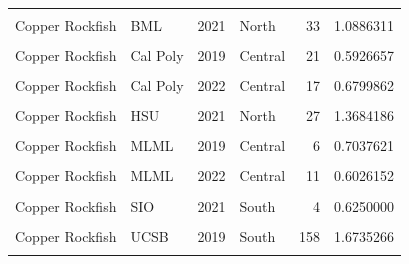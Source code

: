 \documentclass[
]{article}
\begin{document}
\begin{longtable}[t]{llrlrr}
\addlinespace
\cellcolor{gray!6}{Copper Rockfish} & \cellcolor{gray!6}{BML} & \cellcolor{gray!6}{2019} & \cellcolor{gray!6}{North} & \cellcolor{gray!6}{57} & \cellcolor{gray!6}{1.0481411}\\
Copper Rockfish & BML & 2021 & North & 33 & 1.0886311\\
\cellcolor{gray!6}{Copper Rockfish} & \cellcolor{gray!6}{BML} & \cellcolor{gray!6}{2022} & \cellcolor{gray!6}{North} & \cellcolor{gray!6}{22} & \cellcolor{gray!6}{0.7116277}\\
Copper Rockfish & Cal Poly & 2019 & Central & 21 & 0.5926657\\
\cellcolor{gray!6}{Copper Rockfish} & \cellcolor{gray!6}{Cal Poly} & \cellcolor{gray!6}{2021} & \cellcolor{gray!6}{Central} & \cellcolor{gray!6}{9} & \cellcolor{gray!6}{0.6336273}\\
\addlinespace
Copper Rockfish & Cal Poly & 2022 & Central & 17 & 0.6799862\\
\cellcolor{gray!6}{Copper Rockfish} & \cellcolor{gray!6}{HSU} & \cellcolor{gray!6}{2019} & \cellcolor{gray!6}{North} & \cellcolor{gray!6}{27} & \cellcolor{gray!6}{1.2968674}\\
Copper Rockfish & HSU & 2021 & North & 27 & 1.3684186\\
\cellcolor{gray!6}{Copper Rockfish} & \cellcolor{gray!6}{HSU} & \cellcolor{gray!6}{2022} & \cellcolor{gray!6}{North} & \cellcolor{gray!6}{26} & \cellcolor{gray!6}{1.6042550}\\
Copper Rockfish & MLML & 2019 & Central & 6 & 0.7037621\\
\addlinespace
\cellcolor{gray!6}{Copper Rockfish} & \cellcolor{gray!6}{MLML} & \cellcolor{gray!6}{2021} & \cellcolor{gray!6}{Central} & \cellcolor{gray!6}{12} & \cellcolor{gray!6}{0.5870757}\\
Copper Rockfish & MLML & 2022 & Central & 11 & 0.6026152\\
\cellcolor{gray!6}{Copper Rockfish} & \cellcolor{gray!6}{SIO} & \cellcolor{gray!6}{2019} & \cellcolor{gray!6}{South} & \cellcolor{gray!6}{1} & \cellcolor{gray!6}{0.3076923}\\
Copper Rockfish & SIO & 2021 & South & 4 & 0.6250000\\
\cellcolor{gray!6}{Copper Rockfish} & \cellcolor{gray!6}{SIO} & \cellcolor{gray!6}{2022} & \cellcolor{gray!6}{South} & \cellcolor{gray!6}{2} & \cellcolor{gray!6}{0.2857143}\\
\addlinespace
Copper Rockfish & UCSB & 2019 & South & 158 & 1.6735266\\
\cellcolor{gray!6}{Copper Rockfish} & \cellcolor{gray!6}{UCSB} & \cellcolor{gray!6}{2021} & \cellcolor{gray!6}{South} & \cellcolor{gray!6}{123} & \cellcolor{gray!6}{1.1605222}\\

\end{longtable}
\end{document}
